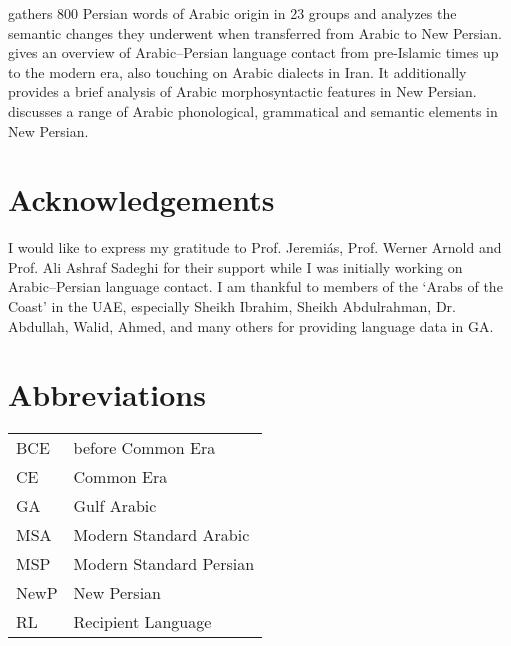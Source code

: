 \documentclass[output=paper]{langsci/langscibook}
\begin{document}
\citet{Asbaghi1987} gathers 800 Persian words of Arabic origin in 23 groups and analyzes the semantic changes they underwent when transferred from Arabic to New Persian.\\
\citet{Gazsi2011} gives an overview of Arabic–Persian language contact from pre-Islamic times up to the modern era, also touching on Arabic dialects in Iran. It additionally provides a brief analysis of Arabic morphosyntactic features in New Persian.\\
\citet{Ṣādeqī2011} discusses a range of Arabic phonological, grammatical and semantic elements in New Persian.

\section*{Acknowledgements}

I would like to express my gratitude to Prof. Jeremiás, Prof. Werner Arnold and Prof. Ali Ashraf Sadeghi for their support while I was initially working on Arabic–Persian language contact. I am thankful to members of the ‘Arabs of the Coast’ in the UAE, especially Sheikh Ibrahim, Sheikh Abdulrahman, Dr. Abdullah, Walid, Ahmed, and many others for providing language data in GA.

\section*{Abbreviations}
\begin{tabularx}{.5\textwidth}{@{}lQ@{}}
BCE & before Common Era\\
CE & Common Era\\
GA & Gulf Arabic\\
MSA &  Modern Standard Arabic\\
MSP  &  Modern Standard Persian\\
NewP   &  New Persian\\
RL &  Recipient Language \\
\end{tabularx}%



{\sloppy\printbibliography[heading=subbibliography,notkeyword=this]}
\end{document}
